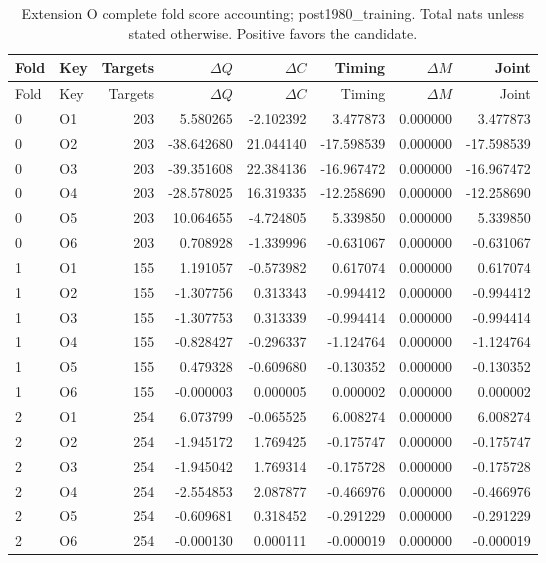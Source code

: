 {\small
\setlength{\tabcolsep}{3pt}
\begin{longtable}{llrrrrrr}
\caption{Extension O complete fold score accounting; post1980\_training. Total nats unless stated otherwise. Positive favors the candidate.}\label{tab:O-post1980_training}\\
\toprule
Fold & Key & Targets & $\Delta Q$ & $\Delta C$ & Timing & $\Delta M$ & Joint\\\midrule
\endfirsthead
\toprule
Fold & Key & Targets & $\Delta Q$ & $\Delta C$ & Timing & $\Delta M$ & Joint\\\midrule
\endhead
0 & O1 & 203 & 5.580265 & -2.102392 & 3.477873 & 0.000000 & 3.477873\\
0 & O2 & 203 & -38.642680 & 21.044140 & -17.598539 & 0.000000 & -17.598539\\
0 & O3 & 203 & -39.351608 & 22.384136 & -16.967472 & 0.000000 & -16.967472\\
0 & O4 & 203 & -28.578025 & 16.319335 & -12.258690 & 0.000000 & -12.258690\\
0 & O5 & 203 & 10.064655 & -4.724805 & 5.339850 & 0.000000 & 5.339850\\
0 & O6 & 203 & 0.708928 & -1.339996 & -0.631067 & 0.000000 & -0.631067\\
1 & O1 & 155 & 1.191057 & -0.573982 & 0.617074 & 0.000000 & 0.617074\\
1 & O2 & 155 & -1.307756 & 0.313343 & -0.994412 & 0.000000 & -0.994412\\
1 & O3 & 155 & -1.307753 & 0.313339 & -0.994414 & 0.000000 & -0.994414\\
1 & O4 & 155 & -0.828427 & -0.296337 & -1.124764 & 0.000000 & -1.124764\\
1 & O5 & 155 & 0.479328 & -0.609680 & -0.130352 & 0.000000 & -0.130352\\
1 & O6 & 155 & -0.000003 & 0.000005 & 0.000002 & 0.000000 & 0.000002\\
2 & O1 & 254 & 6.073799 & -0.065525 & 6.008274 & 0.000000 & 6.008274\\
2 & O2 & 254 & -1.945172 & 1.769425 & -0.175747 & 0.000000 & -0.175747\\
2 & O3 & 254 & -1.945042 & 1.769314 & -0.175728 & 0.000000 & -0.175728\\
2 & O4 & 254 & -2.554853 & 2.087877 & -0.466976 & 0.000000 & -0.466976\\
2 & O5 & 254 & -0.609681 & 0.318452 & -0.291229 & 0.000000 & -0.291229\\
2 & O6 & 254 & -0.000130 & 0.000111 & -0.000019 & 0.000000 & -0.000019\\
\bottomrule
\end{longtable}
}

